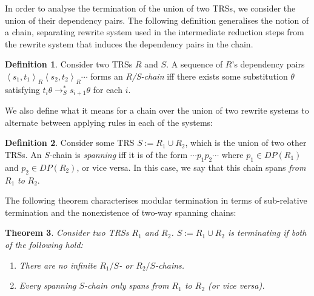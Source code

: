 \documentclass{article}
\newtheorem{theorem}{Theorem}%
\theoremstyle{definition}
\newtheorem{definition}[theorem]{Definition}
\newcommand{\dpair}[2]{\left\langle #1, #2 \right\rangle}
\begin{document}
In order to analyse the termination of the union of two TRSs, we consider the union of their dependency pairs. The following definition generalises the notion of a chain, separating rewrite system used in the intermediate reduction steps from the rewrite system that induces the dependency pairs in the chain.

\begin{definition}
    Consider two TRSs $R$ and $S$. A sequence of $R$'s dependency pairs $\dpair{s_1}{t_1}_R \dpair{s_2}{t_2}_R \cdots$ forms an \emph{R/S-chain} iff there exists some substitution $\theta$ satisfying $t_i \theta \rightarrow^*_S s_{i+1}\theta$ for each $i$. 
\end{definition}

We also define what it means for a chain over the union of two rewrite systems to alternate between applying rules in each of the systems:
\begin{definition}
    Consider some TRS $S := R_1 \cup R_2$, which is the union of two other TRSs. An $S$-chain is \emph{spanning} iff it is of the form $\cdots p_1 p_2 \cdots$ where $p_1 \in DP(R_1)$ and $p_2 \in DP(R_2)$, or vice versa. In this case, we say that this chain spans \emph{from} $R_1$ \emph{to} $R_2$.
\end{definition}
The following theorem characterises modular termination in terms of sub-relative termination and the nonexistence of two-way spanning chains:
\begin{theorem} \label{thm:mod_span_term}
    Consider two TRSs $R_1$ and $R_2$. $S := R_1 \cup R_2$ is terminating if both of the following hold: \begin{enumerate}
        \item There are no infinite $R_1/S$- or $R_2/S$-chains. \label{cond:no_r_chains}
        \item Every spanning $S$-chain only spans from $R_1$ to $R_2$ (or vice versa). \label{cond:no_span_chains}
    \end{enumerate}
\end{theorem}
\end{document}
